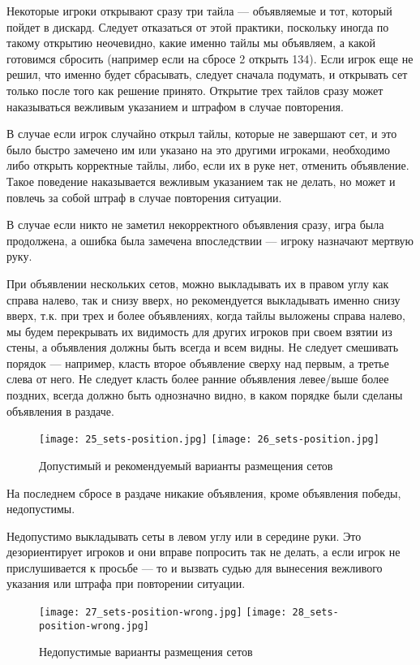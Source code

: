 Некоторые игроки открывают сразу три тайла --- объявляемые и тот, который пойдет в дискард. Следует отказаться от этой практики, поскольку иногда по такому открытию неочевидно, какие именно тайлы мы объявляем, а какой готовимся сбросить (например если на сбросе 2 открыть 134). Если игрок еще не решил, что именно будет сбрасывать, следует сначала подумать, и открывать сет только после того как решение принято. Открытие трех тайлов сразу может наказываться вежливым указанием и штрафом в случае повторения.

В случае если игрок случайно открыл тайлы, которые не завершают сет, и это было быстро замечено им или указано на это другими игроками, необходимо либо открыть корректные тайлы, либо, если их в руке нет, отменить объявление. Такое поведение наказывается вежливым указанием так не делать, но может и повлечь за собой штраф в случае повторения ситуации.

В случае если никто не заметил некорректного объявления сразу, игра была продолжена, а ошибка была замечена впоследствии --- игроку назначают мертвую руку.

При объявлении нескольких сетов, можно выкладывать их в правом углу как справа налево, так и снизу вверх, но рекомендуется выкладывать именно снизу вверх, т.к. при трех и более объявлениях, когда тайлы выложены справа налево, мы будем перекрывать их видимость для других игроков при своем взятии из стены, а объявления должны быть всегда и всем видны. Не следует смешивать порядок --- например, класть второе объявление сверху над первым, а третье слева от него. Не следует класть более ранние объявления левее/выше более поздних, всегда должно быть однозначно видно, в каком порядке были сделаны объявления в раздаче.

\begin{figure}[H]
	\centering
	\texttt{[image: 25\_sets-position.jpg]}
	\texttt{[image: 26\_sets-position.jpg]}
	\caption{Допустимый и рекомендуемый варианты размещения сетов}
\end{figure}

На последнем сбросе в раздаче никакие объявления, кроме объявления победы, недопустимы.

Недопустимо выкладывать сеты в левом углу или в середине руки. Это дезориентирует игроков и они вправе попросить так не делать, а если игрок не прислушивается к просьбе --- то и вызвать судью для вынесения вежливого указания или штрафа при повторении ситуации.

\begin{figure}[H]
	\centering
	\texttt{[image: 27\_sets-position-wrong.jpg]}
	\texttt{[image: 28\_sets-position-wrong.jpg]}
	\caption{Недопустимые варианты размещения сетов}
\end{figure}

